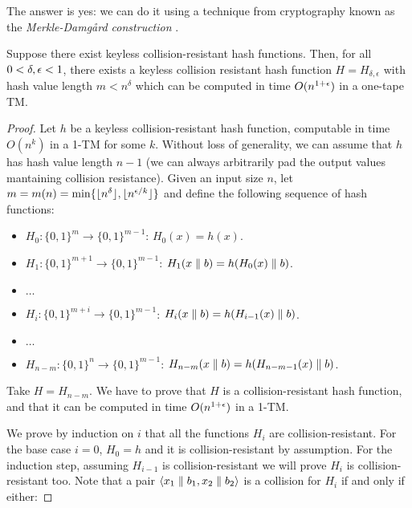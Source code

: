 The answer is yes: we can do it using a technique from cryptography known as the \emph{Merkle-Damgård construction} \cite{Merkle90, Damgard90}.

\begin{theorem}
\label{thm:hashonetape}
Suppose there exist keyless collision-resistant hash functions. Then, for all $0 < \delta, \epsilon < 1$, there exists a keyless collision resistant hash
function $H = H_{\delta, \epsilon}$ with hash value length $m < n^\delta$ which can be computed in time $O(n^{1+\epsilon})$ in a one-tape
TM.
\end{theorem}

\begin{proof}
Let $h$ be a keyless collision-resistant hash function, computable in time $O(n^k)$ in a 1-TM for some $k$.
Without loss of generality, we can assume that $h$ has hash value length $n-1$ (we can always arbitrarily
pad the output values mantaining collision resistance). Given an input size $n$, 
let $m = m(n) = \min\{\lfloor n^\delta \rfloor,  \lfloor n^{\epsilon/k} \rfloor \}$ and define the following sequence of hash functions:


\begin{itemize}
    \item $H_0 \colon \{0, 1\}^m \to \{0, 1\}^{m-1}$: $H_0(x) = h(x)$.
    \item $H_1 \colon \{0, 1\}^{m+1} \to \{0, 1\}^{m-1}$: $H_1(x \parallel b) = h(H_0(x) \parallel b)$.
    \item $\dots$
    \item $H_i \colon \{0, 1\}^{m+i} \to \{0, 1\}^{m-1}$: $H_i(x \parallel b) = h(H_{i-1}(x) \parallel b)$.
    \item $\dots$
    \item $H_{n-m} \colon \{0, 1\}^{n} \to \{0, 1\}^{m-1}$: $H_{n-m}(x \parallel b) = h(H_{n-m-1}(x) \parallel b)$.
\end{itemize}



Take $H = H_{n-m}$. We have to prove that $H$ is a collision-resistant hash function, and that it can be
computed in time $O(n^{1+\epsilon})$ in a 1-TM. 

We prove by induction on $i$ that all the functions $H_i$ are collision-resistant. For the base case $i = 0$, 
$H_0 = h$ and it is collision-resistant by assumption. For the induction step, assuming $H_{i-1}$ is
collision-resistant we will prove $H_i$ is collision-resistant too. 
Note that a pair $\langle x_1 \parallel b_1 , x_2 \parallel b_2 \rangle$ is a collision for $H_i$ if and only if either:


\end{proof}
